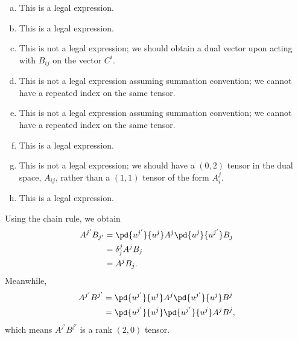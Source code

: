 \documentclass[10pt]{mypackage}
\begin{document}
\RaggedRight
\begin{solution}[30.1]
  \begin{enumerate}[(a)]
    \item This is a legal expression.
    \item This is a legal expression.
    \item This is not a legal expression; we should obtain a dual vector upon acting with $B_{ij}$ on the vector $C^{i}$.
    \item This is not a legal expression assuming summation convention; we cannot have a repeated index on the same tensor.
    \item This is not a legal expression assuming summation convention; we cannot have a repeated index on the same tensor.
    \item This is a legal expression.
    \item This is not a legal expression; we should have a $(0,2)$ tensor in the dual space, $A_{ij}$, rather than a $(1,1)$ tensor of the form $A_{i}^{j}$.
    \item This is a legal expression.
  \end{enumerate}
\end{solution}
\begin{solution}[30.3]
  Using the chain rule, we obtain
  \begin{align*}
    A^{j'}B_{j'} &= \pd{u^{j'}}{u^{j}}A^{j}\pd{u^{j}}{u^{j'}}B_{j}\\
                 &= \delta_{j}^{j}A^jB_j\\
                 &= A^jB_j.
  \end{align*}
  Meanwhile,
  \begin{align*}
    A^{j'}B^{j'} &= \pd{u^{j'}}{u^{j}}A^{j}\pd{u^{j'}}{u^{j}}B^{j}\\
                 &= \pd{u^{j'}}{u^{j}}\pd{u^{j'}}{u^{j}}A^{j}B^{j},
  \end{align*}
  which means $A^{j'}B^{j'}$ is a rank $(2,0)$ tensor.
\end{solution}
\begin{solution}[30.5]

\end{solution}
\begin{solution}[30.6]

\end{solution}
\begin{solution}[30.16]

\end{solution}
\begin{solution}[30.20]

\end{solution}
\begin{solution}[30.21]

\end{solution}
\begin{solution}[30.22]

\end{solution}
\begin{solution}[30.28]

\end{solution}
\end{document}
